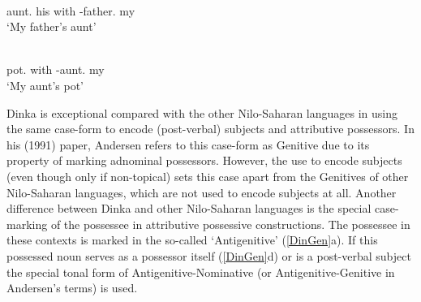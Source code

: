 \begin{exe}\ex\label{TurGenKin}
\begin{xlist}
\ex\gll{}   \textbf{} \\
aunt.\acc{} his with \NC{}-father.\acc{} my\\
\glt `My father's aunt' %

\ex\gll {}  \textbf{} \\
pot.\acc{} with \NC{}-aunt.\acc{} my\\
\glt `My aunt's pot' %
\end{xlist}
\end{exe}

Dinka is exceptional compared with the other Nilo-Saharan languages in using the same case-form to encode (post-verbal) subjects and attributive possessors. 
In his (1991) paper, Andersen refers to this case-form as Genitive due to its property of marking adnominal possessors. 
However, the use to encode subjects (even though only if non-topical) sets this case apart from the Genitives of other Nilo-Saharan languages, which are not used to encode subjects at all. 
Another difference between Dinka and other Nilo-Saharan languages is the special case-marking of the possessee in attributive possessive constructions. 
The possessee in these contexts is marked in the so-called `Antigenitive' (\ref{DinGen}a).
If this possessed noun serves as a possessor itself (\ref{DinGen}d) or is a post-verbal subject the special tonal form of Antigenitive-Nominative (or Antigenitive-Genitive in Andersen's terms) is used.  

